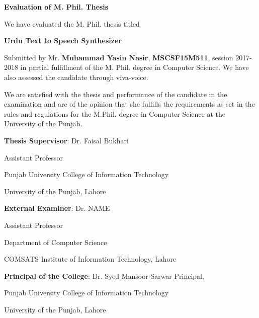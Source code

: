 
\begin{center}
    

\large{\textbf{Evaluation of M. Phil. Thesis}}
\end{center}

We have evaluated the M. Phil. thesis titled
\begin{center}
\textbf{Urdu Text to Speech Synthesizer}
\end{center}

Submitted by Mr. \textbf{Muhammad Yasin Nasir}, \textbf{MSCSF15M511}, session 2017-2018 in partial fulfillment of the M. Phil. degree in Computer Science. We have also assessed the candidate through viva-voice.

We are satisfied with the thesis and performance of the candidate in the examination and are of the opinion that she fulfills the requirements as set in the rules and regulations for the M.Phil. degree in Computer Science at the University of the Punjab.

\bigskip
\bigskip
 \textbf{Thesis Supervisor}:	\hfill Dr. Faisal Bukhari

\hfill Assistant Professor

\hfill Punjab University College of Information Technology

\hfill University of the Punjab, Lahore


\bigskip

\bigskip
\textbf{External Examiner}: \hfill Dr. NAME

   \hfill Assistant Professor 

\hfill Department of Computer Science

  \hfill COMSATS Institute of Information Technology, Lahore


\bigskip

\bigskip
\textbf{Principal of the College}:  \hfill Dr. Syed Mansoor Sarwar
Principal, 

\hfill Punjab University College of Information Technology

\hfill University of the Punjab, Lahore
